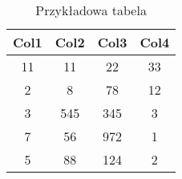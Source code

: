 \begin{table}[htbp]
\centering
\begin{tabular}{|c| |c| |c| |c|} \hline
 Col1 & Col2 & Col3 & Col4 \\ [0.5ex] \hline\hline
 11 & 11 & 22 & 33 \\ \hline
 2 & 8 & 78 & 12 \\ \hline
 3 & 545 & 345 & 3 \\ \hline
 7 & 56 & 972 & 1\\ \hline
 5 & 88 & 124 & 2 \\ \hline
\end{tabular}
\label{tab:table_A}
\caption{Przykładowa tabela}
\end{table}